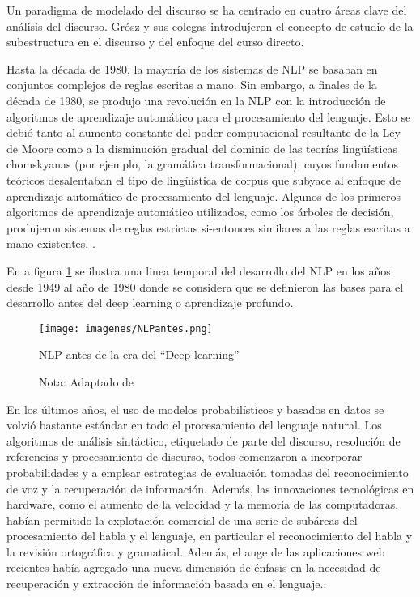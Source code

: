 \documentclass[12pt]{article}
\begin{document}
			
			Un paradigma de modelado del discurso se ha centrado en cuatro áreas clave del análisis del discurso. Grósz y sus colegas introdujeron el concepto de estudio de la subestructura en el discurso y del enfoque del curso directo.\cite{Kumar2011}
			
			Hasta la década de 1980, la mayoría de los sistemas de NLP se basaban en conjuntos complejos de reglas escritas a mano. Sin embargo, a finales de la década de 1980, se produjo una revolución en la NLP con la introducción de algoritmos de aprendizaje automático para el procesamiento del lenguaje. Esto se debió tanto al aumento constante del poder computacional resultante de la Ley de Moore como a la disminución gradual del dominio de las teorías lingüísticas chomskyanas (por ejemplo, la gramática transformacional), cuyos fundamentos teóricos desalentaban el tipo de lingüística de corpus que subyace al enfoque de aprendizaje automático de procesamiento del lenguaje. Algunos de los primeros algoritmos de aprendizaje automático utilizados, como los árboles de decisión, produjeron sistemas de reglas estrictas si-entonces similares a las reglas escritas a mano existentes. \cite{umessantilal2020}.
			
			En a figura \ref{fig:NLPantes} se ilustra una linea temporal del desarrollo del NLP en los años desde 1949 al año de  1980 donde se considera que se definieron las bases para el desarrollo antes del deep learning o aprendizaje profundo.
								
			\begin{figure}[H]
				\texttt{[image: imagenes/NLPantes.png]}
				\centering
				\caption{NLP antes de la era del ``Deep learning''}
				\caption*{\small Nota: Adaptado de  \cite{Louis2020}}
				\label{fig:NLPantes}
			\end{figure}
			
			
			En los últimos años, el uso de modelos probabilísticos y basados en datos se volvió bastante estándar en todo el procesamiento del lenguaje natural. Los algoritmos de análisis sintáctico, etiquetado de parte del discurso, resolución de referencias y procesamiento de discurso, todos comenzaron a incorporar probabilidades y a emplear estrategias de evaluación tomadas del reconocimiento de voz y la recuperación de información. Además, las innovaciones tecnológicas en hardware, como el aumento de la velocidad y la memoria de las computadoras, habían permitido la explotación comercial de una serie de subáreas del procesamiento del habla y el lenguaje, en particular el reconocimiento del habla y la revisión ortográfica y gramatical. Además, el auge de las aplicaciones web recientes había agregado una nueva dimensión de énfasis en la necesidad de recuperación y extracción de información basada en el lenguaje.\cite{Kumar2011}.
			
\end{document}
